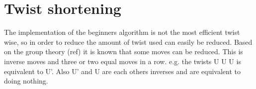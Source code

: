 







\section{Twist shortening}
The implementation of the beginners algorithm is not the most efficient twist wise, so in order to reduce the amount of twist used can easily be reduced. Based on the group theory (ref) it is known that some moves can be reduced. This is inverse moves and  three or two equal moves  in a row. e.g.  the twists U U U is equivalent to U'. Also U' and U are each others inverses and are equivalent to doing nothing. 